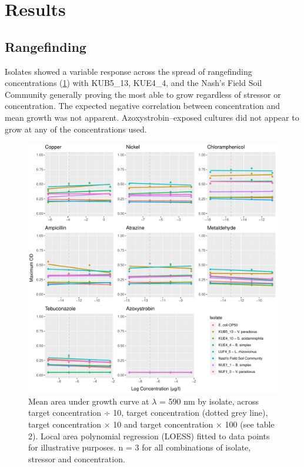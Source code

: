 \documentclass[final,1p,times]{elsarticle}
\begin{document}
\section{Results}
\label{S:3}

\subsection{Rangefinding}
\label{S:3:1}

Isolates showed a variable response across the spread of rangefinding concentrations (\cref{fig:rangefinding}) with KUB5\_13, KUE4\_4, and the Nash's Field Soil Community generally proving the most able to grow regardless of stressor or concentration. The expected negative correlation between concentration and mean growth was not apparent. Azoxystrobin--exposed cultures did not appear to grow at any of the concentrations used.

\begin{figure}[H]
    \centering
    \includegraphics[width = \textwidth]{Scripts/Results/Bug_Rangefinding/plots_rangefinding.pdf}
    \caption{Mean area under growth curve at $\lambda$ = 590 nm by isolate, across target concentration ÷ 10, target concentration (dotted grey line), target concentration × 10 and target concentration × 100 (see table 2). Local area polynomial regression (LOESS) fitted to data points for illustrative purposes. n = 3 for all combinations of isolate, stressor and concentration.}
    \label{fig:rangefinding}
\end{figure}
\end{document}
